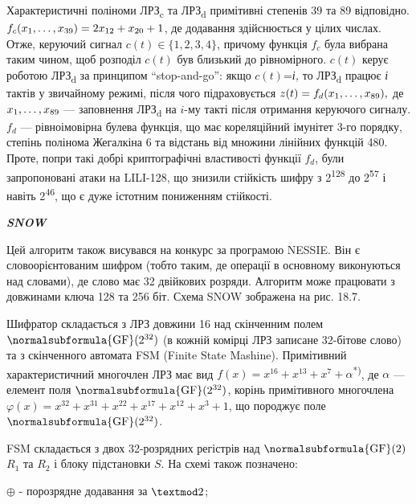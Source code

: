 Характеристичні поліноми ЛРЗ\textsubscript{c} та ЛРЗ\textsubscript{d} примітивні
степенів 39 та 89 відповідно. 
$f_{c}(x_{1},\dots,x_{\text{39}})=2x_{\text{12}}+x_{\text20}+1$,
де додавання здійснюється у цілих числах. Отже, керуючий сигнал  ${c(t)\in
\{1,2,3,4\}}$, причому функція  $f_c$ була вибрана таким чином, щоб
розподіл  $c(t)$ був близький до рівномірного.  $c(t)$ керує роботою
ЛРЗ\textsubscript{d} за принципом “stop{}-and{}-go”: якщо  $c(t)$=\textit{і,
}то ЛРЗ\textsubscript{d} працює \textit{ і} тактів у звичайному режимі, після
чого  підраховується 
$z(t)=f_{d}(x_{1},\dots,x_{\text89}),$ де 
$x_{1},\dots,x_{\text89}$ --- заповнення
ЛРЗ\textsubscript{d} на   $i${}-му такті після отримання керуючого сигналу. 
$f_d$ --- рівноімовірна булева функція, що має кореляційний імунітет 3-го
порядку, степінь полінома Жегалкіна 6 та відстань від множини лінійних функцій
480. Проте, попри такі добрі криптографічні властивості функції  $f_d$,
були запропоновані атаки на LILI{}-128, що знизили стійкість шифру з
2\textsuperscript{128} до 2\textsuperscript{57} і навіть 2\textsuperscript{46},
що є дуже істотним пониженням стійкості.  


\bigskip

{\centering\bfseries\itshape
SNOW
\par}


\bigskip

Цей алгоритм також висувався на конкурс за програмою NESSIE. Він є
словоорієнтованим шифром (тобто таким, де операції в основному виконуються над
словами), де слово має 32 двійкових розряди. Алгоритм може працювати  з
довжинами ключа 128 та 256 біт. Схема SNOW зображена на рис. 18.7.

Шифратор складається з ЛРЗ довжини 16 над скінченним полем 
$\normalsubformula{\text{GF}}(2^{\text32})$ (в кожній комірці ЛРЗ
записане 32-бітове слово) та з скінченного автомата FSM (Finite State Mashine).
Примітивний характеристичний многочлен ЛРЗ  має вид 
$f(x)=x^{\text{16}}+x^{\text{13}}+x^7+\alpha $\textsuperscript{*)},
де  $\alpha $ --- елемент поля 
$\normalsubformula{\text{GF}}(2^{\text32})$, корінь примітивного
многочлена  ${\varphi
(x)=x^{\text{32}}+x^{\text{31}}+x^{\text{22}}+x^{\text{17}}+x^{\text{12}}+x^{3}+1}$,
що породжує поле  $\normalsubformula{\text{GF}}(2^{\text32})$.

FSM складається з двох 32-розрядних регістрів над 
$\normalsubformula{\text{GF}}(2)$  $R_1$ та  $R_2$ і блоку
підстановки  $S$. На схемі також позначено: 

 ${\oplus}$ - порозрядне додавання за  $\textmod2$;

